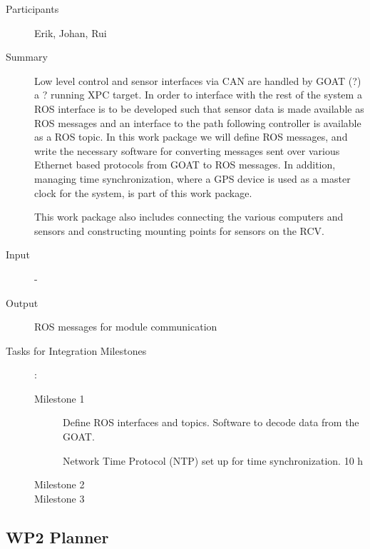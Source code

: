 \documentclass[11pt,a4paper]{article}
\begin{document}
\begin{description}
\item[Participants] Erik, Johan, Rui
\item[Summary] Low level control and sensor interfaces via CAN are
  handled by GOAT (?)  a ? running XPC target. In order to interface
  with the rest of the system a ROS interface is to be developed such
  that sensor data is made available as ROS messages and an interface
  to the path following controller is available as a ROS topic. In this
  work package we will define ROS messages, and write the necessary
  software for converting messages sent over various Ethernet based
  protocols from GOAT to ROS messages. In addition, managing time
  synchronization, where a GPS device is used as a master clock for the
  system, is part of this work package.

  This work package also includes connecting the various computers and
  sensors and constructing mounting points for sensors on the RCV.
   
\item[Input] -
\item[Output] ROS messages for module communication
\item[Tasks for Integration Milestones]:\
	\begin{description}
		\item[Milestone 1] Define ROS interfaces and topics. Software to decode data from the GOAT. 

  Network Time Protocol (NTP) set up for time synchronization. 10 h
		\item[Milestone 2]
		\item[Milestone 3] 
	\end{description}	 
\end{description}

\subsection{WP2 Planner}
\end{document}
